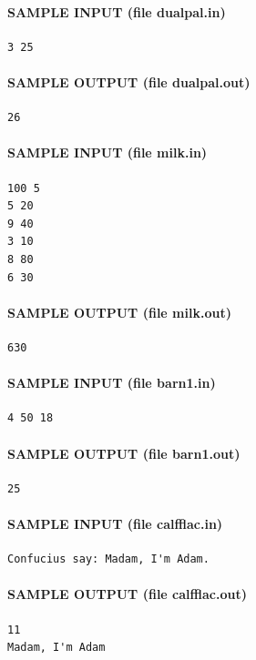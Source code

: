 \documentclass[11pt]{article}
\begin{document}
\paragraph{SAMPLE INPUT (file dualpal.in)}
\begin{verbatim}
3 25
\end{verbatim}

\paragraph{SAMPLE OUTPUT (file dualpal.out)}
\begin{verbatim}
26
\end{verbatim}

\paragraph{SAMPLE INPUT (file milk.in)}
\begin{verbatim}
100 5
5 20
9 40
3 10
8 80
6 30
\end{verbatim}

\paragraph{SAMPLE OUTPUT (file milk.out)}
\begin{verbatim}
630
\end{verbatim}

\paragraph{SAMPLE INPUT (file barn1.in)}
\begin{verbatim}
4 50 18
\end{verbatim}

\paragraph{SAMPLE OUTPUT (file barn1.out)}
\begin{verbatim}
25
\end{verbatim}

\paragraph{SAMPLE INPUT (file calfflac.in)}
\begin{verbatim}
Confucius say: Madam, I'm Adam.
\end{verbatim}

\paragraph{SAMPLE OUTPUT (file calfflac.out)}
\begin{verbatim}
11
Madam, I'm Adam
\end{verbatim}
\end{document}
